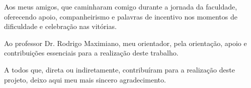 \documentclass{ecatfg}
\begin{document}
Aos meus amigos, que caminharam comigo durante a jornada da faculdade, oferecendo apoio, companheirismo e palavras de incentivo nos momentos de dificuldade e celebração nas vitórias. \par

Ao professor Dr. Rodrigo Maximiano, meu orientador, pela orientação, apoio e contribuições essenciais para a realização deste trabalho. \par

A todos que, direta ou indiretamente, contribuíram para a realização deste projeto, deixo aqui meu mais sincero agradecimento. \par
	




		
\end{document}
